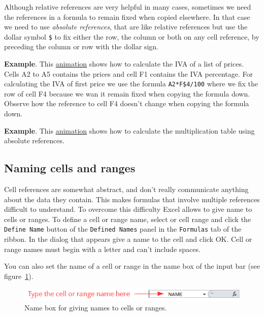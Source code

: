 Although relative references are very helpful in many cases, sometimes we need the references in a formula to remain fixed when copied elsewhere.\newline
In that case we need to use \emph{absolute references}, that are like relative references but use the dollar symbol \texttt{\$} to fix either the row, the column or both on any cell reference, by preceding the column or row with the dollar sign.

\textbf{Example}. This
\href{http://aprendeconalf.es/office/excel/manual/img/example_copying_formulas_with_absolute_references.gif}{animation} shows how to calculate the IVA of a list of prices. Cells A2 to A5 contains the prices and cell F1 contains the IVA percentage. For calculating the IVA of first price we use the formula \texttt{A2*F\$4/100} where we fix the row of cell F4 because we wan it remain fixed when copying the formula down. Observe how the reference to cell F4 doesn't change when copying the formula down.

\textbf{Example}. This \href{http://aprendeconalf.es/office/excel/manual/img/example_multiplication_table.gif}{animation} shows how to calculate the multiplication table using absolute references.

\subsection{Naming cells and ranges}\hypertarget{naming-cells-and-ranges}{}\label{naming-cells-and-ranges}

Cell references are somewhat abstract, and don't really communicate anything about the data they contain. This makes formulas that involve multiple references difficult to understand. To overcome this difficulty Excel allows to give name to cells or ranges. To define a cell or range name, select or cell range and click the \texttt{Define Name} button of the \texttt{Defined Names} panel in the \texttt{Formulas} tab of the ribbon. In the dialog that appears give a name to the cell and click OK. Cell or range names must begin with a letter and can't include spaces.

You can also set the name of a cell or range in the name box of the input bar (see figure~\ref{img-name_box}).

\begin{figure}[htbp]
\begin{center}
\includegraphics[scale=0.7]{../img/name_box.png}
\end{center}
\caption{Name box for giving names to cells or ranges.}
\label{img-name_box}
\end{figure}

